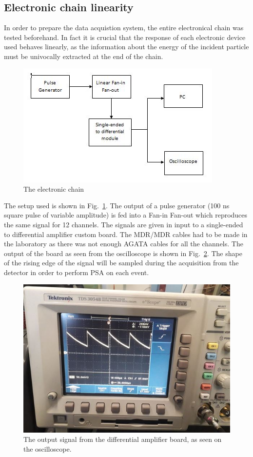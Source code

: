 \subsection{Electronic chain linearity}

In order to prepare the data acquistion system, the entire electronical chain
was tested beforehand. In fact it is crucial that the response of each
electronic device used behaves linearly, as the information about the energy
of the incident particle must be univocally extracted at the end of the chain.

\begin{figure}[h]
  \centering
  \includegraphics[scale=.5]{img/electronic_chain_diagram.JPG}
  \caption{The electronic chain}
  \label{chain}
\end{figure}

The setup used is shown in Fig.~\ref{chain}. The output of a pulse generator (\num{100} ns square pulse of variable amplitude) is fed into a Fan-in Fan-out which reproduces the same signal for 12 channels. The signals are given in input to a single-ended to differential amplifier custom board. The MDR/MDR cables had to be made in the laboratory as there was not enough AGATA cables for all the channels.
The output of the board as seen from the oscilloscope is shown in Fig.~\ref{osc}. The shape of the rising edge of the signal will be sampled during the acquisition from the detector in order to perform PSA on each event.

\begin{figure}[h]
  \centering
  \includegraphics[scale=.35]{img/test_signal_oscilloscope.JPG}
  \caption{The output signal from the differential amplifier board, as seen on the oscilloscope.}
  \label{osc}
\end{figure}

